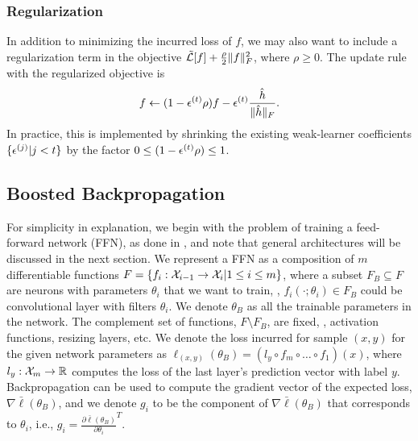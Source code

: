 \subsubsection{Regularization}
\label{sec:reg}
In addition to minimizing the incurred loss of $f$, we may also want to include
a regularization term in the objective $\tilde{{\mathcal{L}}}[f] + \frac{\rho}{2} \Vert f \Vert_F^2$, where 
$\rho \geq 0$. The update rule with the regularized objective is
%
\begin{equation}
\label{eq:reg}
f \gets (1-{\epsilon}^{(t)}\rho) f -  {\epsilon}^{(t)} \frac{\hat{h}}{\Vert \hat{h} \Vert_F}.
\end{equation}
%
In practice, this is implemented by shrinking the existing weak-learner coefficients $\{{\epsilon}^{(j)}|j<t\}$
by the factor $0 \leq (1-{\epsilon}^{(t)}\rho) \leq 1$.

\subsection{Boosted Backpropagation}
\label{sec:bbp}

For simplicity in explanation, we begin with the problem of training a feed-forward
network (FFN), as done in \citet{grub2010}, and note that general architectures
will be discussed in the next section.
We represent a FFN as a composition of $m$ differentiable functions
$F = \{f_i:{\mathcal{X}}_{i-1} \to {\mathcal{X}}_i| 1 \leq i \leq m \}$, where a subset $F_B \subseteq F$
are neurons with parameters $\theta_i$ that we want to train, \eg,
$f_i(\cdot;\theta_i) \in F_B$ could be convolutional layer with filters $\theta_i$.
We denote $\theta_B$ as all the trainable parameters in the network.
The complement set of functions, $F \setminus F_B$, are fixed, \eg, activation functions, resizing layers, etc.
We denote the loss incurred for sample $(x,y)$ for the given network parameters
as $\ell_{(x,y)}(\theta_B) = (l_y \circ f_m \circ \ldots \circ f_1)(x)$,
where $l_y: {\mathcal{X}}_m \to {\mathbb{R}}$ computes the loss of the last layer's prediction vector with label $y$.
Backpropagation can be used to compute the gradient vector of the
expected loss, $\nabla \bar\ell(\theta_B)$,
and we denote $g_i$ to be the component of $\nabla \bar\ell(\theta_B)$
that corresponds to $\theta_i$, i.e., $g_i = \frac{\partial\bar\ell(\theta_B)}{\partial \theta_i}^T$.

